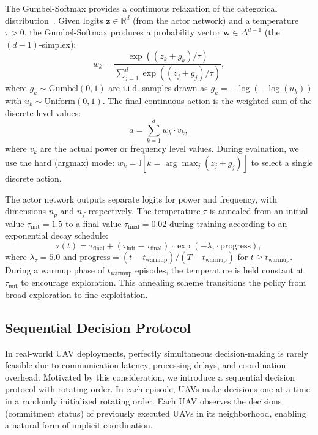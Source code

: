 \documentclass[conference]{IEEEtran}
\begin{document}
The Gumbel-Softmax provides a continuous relaxation of the categorical distribution~\cite{ref_gumbel_softmax,ref_gumbel_softmax2}. Given logits $\mathbf{z} \in \mathbb{R}^d$ (from the actor network) and a temperature $\tau > 0$, the Gumbel-Softmax produces a probability vector $\mathbf{w} \in \Delta^{d-1}$ (the $(d-1)$-simplex):
\begin{equation}
w_k = \frac{\exp((z_k + g_k)/\tau)}{\sum_{j=1}^{d} \exp((z_j + g_j)/\tau)},
\label{eq:gumbel_softmax}
\end{equation}
where $g_k \sim \text{Gumbel}(0, 1)$ are i.i.d. samples drawn as $g_k = -\log(-\log(u_k))$ with $u_k \sim \text{Uniform}(0, 1)$. The final continuous action is the weighted sum of the discrete level values:
\begin{equation}
a = \sum_{k=1}^{d} w_k \cdot v_k,
\label{eq:weighted_sum}
\end{equation}
where $v_k$ are the actual power or frequency level values. During evaluation, we use the hard (argmax) mode: $w_k = \mathbb{I}[k = \arg\max_j (z_j + g_j)]$ to select a single discrete action.

The actor network outputs separate logits for power and frequency, with dimensions $n_p$ and $n_f$ respectively. The temperature $\tau$ is annealed from an initial value $\tau_{\text{init}} = 1.5$ to a final value $\tau_{\text{final}} = 0.02$ during training according to an exponential decay schedule:
\begin{equation}
\tau(t) = \tau_{\text{final}} + (\tau_{\text{init}} - \tau_{\text{final}}) \cdot \exp(-\lambda_\tau \cdot \text{progress}),
\label{eq:temp_anneal}
\end{equation}
where $\lambda_\tau = 5.0$ and $\text{progress} = (t - t_{\text{warmup}}) / (T - t_{\text{warmup}})$ for $t \geq t_{\text{warmup}}$. During a warmup phase of $t_{\text{warmup}}$ episodes, the temperature is held constant at $\tau_{\text{init}}$ to encourage exploration. This annealing scheme transitions the policy from broad exploration to fine exploitation.

\subsection{Sequential Decision Protocol}

In real-world UAV deployments, perfectly simultaneous decision-making is rarely feasible due to communication latency, processing delays, and coordination overhead. Motivated by this consideration, we introduce a sequential decision protocol with rotating order. In each episode, UAVs make decisions one at a time in a randomly initialized rotating order. Each UAV observes the decisions (commitment status) of previously executed UAVs in its neighborhood, enabling a natural form of implicit coordination.
\end{document}
